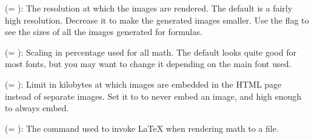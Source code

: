 \documentclass{book}
\begin{document}
\begin{mdUl}[class={list-star,loose},data-line={2239}]
\begin{mdLi}[id=item-math,data-line={2280}]
\begin{mdUl}[class={list-star,loose},data-line={2282}]
\begin{mdLi}[data-line={2285}]
\begin{mdP}[data-line={2285}]
{}%
{} %
{}%
{} (=%
{}%
{}): The resolution at which the images are rendered.
  The default is a fairly high resolution. Decrease it to make the
  generated images smaller. Use the %
{}%
{} flag to see the sizes of
  all the images generated for formulas.%
\end{mdP}%
\end{mdLi}%
\begin{mdLi}[data-line={2289}]%
\begin{mdP}[data-line={2289}]%
{}%
{} %
{}%
{} (=%
{}%
{}): Scaling in percentage used for all math. The default looks 
  quite good for most fonts, but you may want to change it depending
  on the main font used.%
\end{mdP}%
\end{mdLi}%
\begin{mdLi}[data-line={2292}]%
\begin{mdP}[data-line={2292}]%
{}%
{}%
{} (=%
{}%
{}): Limit in kilobytes at which images are embedded
  in the HTML page instead of separate %
{}%
{} images. Set it to %
{}%
{}
  to never embed an image, and high enough to always embed.%
\end{mdP}%
\end{mdLi}%
\begin{mdLi}[data-line={2295}]%
\begin{mdP}[data-line={2295}]%
{}%
{} %
{}%
{} (=%
{}%
{}): The command used to invoke LaTeX when rendering
  math to a %
{}%
{} file.%
\end{mdP}%
\end{mdLi}%

\end{mdUl}
\end{mdLi}
\end{mdUl}
\end{document}
